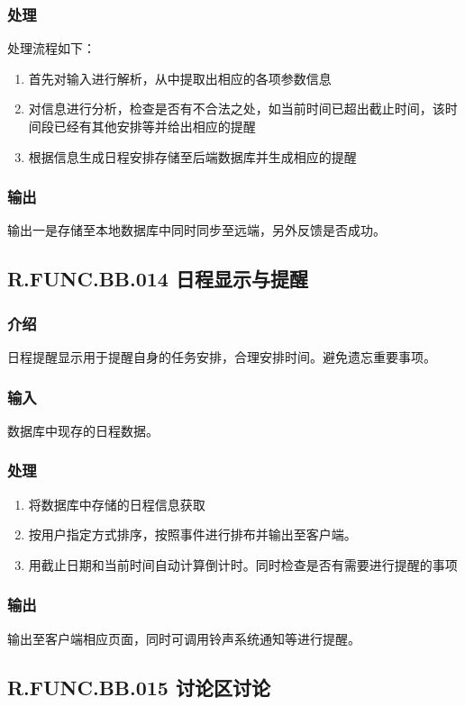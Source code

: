     \subsubsection{处理}
    处理流程如下：
    \begin{enumerate}
      \item 首先对输入进行解析，从中提取出相应的各项参数信息
      \item 对信息进行分析，检查是否有不合法之处，如当前时间已超出截止时间，该时间段已经有其他安排等并给出相应的提醒
      \item 根据信息生成日程安排存储至后端数据库并生成相应的提醒
    \end{enumerate}
    \subsubsection{输出}
    输出一是存储至本地数据库中同时同步至远端，另外反馈是否成功。

  \subsection{R.FUNC.BB.014 日程显示与提醒}
    \subsubsection{介绍}
    日程提醒显示用于提醒自身的任务安排，合理安排时间。避免遗忘重要事项。
    \subsubsection{输入}
    数据库中现存的日程数据。
    \subsubsection{处理}
    \begin{enumerate}
      \item 将数据库中存储的日程信息获取
      \item 按用户指定方式排序，按照事件进行排布并输出至客户端。
      \item 用截止日期和当前时间自动计算倒计时。同时检查是否有需要进行提醒的事项
    \end{enumerate}
    \subsubsection{输出}
    输出至客户端相应页面，同时可调用铃声系统通知等进行提醒。

  \subsection{R.FUNC.BB.015 讨论区讨论}
